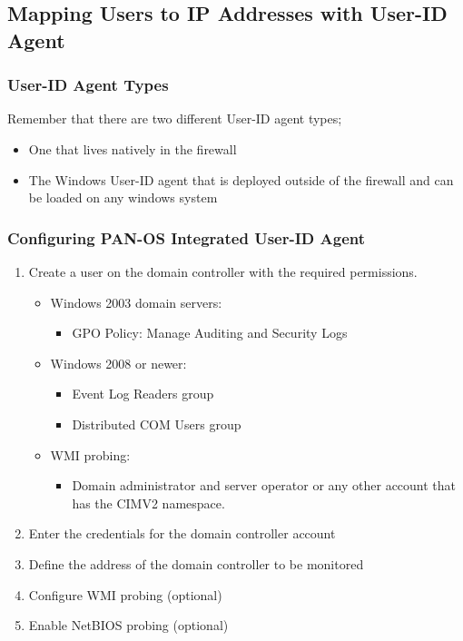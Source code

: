 \subsection{Mapping Users to IP Addresses with User-ID Agent}
\subsubsection{User-ID Agent Types}
Remember that there are two different User-ID agent types;
\begin{itemize}
    \item One that lives natively in the firewall
    \item The Windows User-ID agent that is deployed outside of the firewall and can be loaded on any windows system
\end{itemize}

\subsubsection{Configuring PAN-OS Integrated User-ID Agent}
\begin{enumerate}
    \item Create a user on the domain controller with the required permissions.
        \begin{itemize}
            \item Windows 2003 domain servers:
                \begin{itemize}
                    \item GPO Policy: Manage Auditing and Security Logs
                \end{itemize}
            \item Windows 2008 or newer:
                \begin{itemize}
                    \item Event Log Readers group
                    \item Distributed COM Users group
                \end{itemize}
            \item WMI probing:
                \begin{itemize}
                    \item Domain administrator and server operator or any other account that has the CIMV2 namespace.
                \end{itemize}
        \end{itemize}
    \item Enter the credentials for the domain controller account
    \item Define the address of the domain controller to be monitored
    \item Configure WMI probing (optional)
    \item Enable NetBIOS probing (optional)
\end{enumerate}

